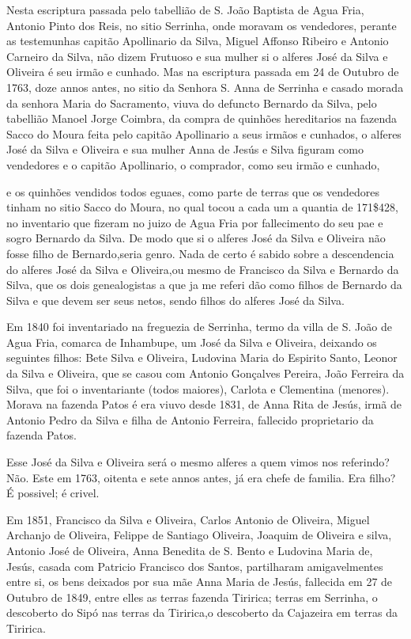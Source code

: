 Nesta escriptura passada pelo tabellião de S. João Baptista de Agua Fria, Antonio Pinto dos Reis, no sitio Serrinha, onde  moravam os vendedores, perante as testemunhas capitão
Apollinario da Silva, Miguel Affonso Ribeiro e Antonio Carneiro da Silva, não dizem Frutuoso e sua mulher si o alferes José da Silva e Oliveira é seu irmão e cunhado. Mas na escriptura passada em 24 de Outubro de 1763, doze annos antes, no sitio da Senhora S. Anna de Serrinha e casado morada da senhora Maria do Sacramento, viuva do defuncto Bernardo da Silva, pelo tabellião Manoel Jorge Coimbra, da compra de quinhões hereditarios na fazenda Sacco do Moura feita pelo capitão Apollinario a seus irmãos e cunhados, o alferes José da Silva e Oliveira e sua mulher Anna de Jesús e Silva figuram como vendedores e o capitão Apollinario, o comprador, como  seu irmão e cunhado,

e os quinhões vendidos todos eguaes, como parte de terras que os vendedores tinham no sitio Sacco do Moura, no qual tocou a cada um a quantia de 171\$428, no inventario que fizeram no juizo de Agua Fria por fallecimento do seu pae e sogro Bernardo da Silva. De modo que si o alferes José da Silva e Oliveira não fosse filho de Bernardo,seria genro. Nada de certo é sabido sobre a descendencia do alferes José da Silva e Oliveira,ou mesmo de Francisco da Silva e Bernardo da Silva, que os dois genealogistas a que ja me referi dão como filhos de Bernardo da Silva e  que devem ser seus netos, sendo filhos do alferes José da Silva.

Em 1840 foi inventariado na freguezia de Serrinha, termo da  villa de S. João de Agua Fria, comarca de Inhambupe, um José da Silva e Oliveira, deixando os seguintes filhos: Bete Silva e Oliveira, Ludovina Maria do Espirito Santo, Leonor da Silva e Oliveira, que se casou com Antonio Gonçalves Pereira, João Ferreira da Silva, que foi o inventariante (todos maiores), Carlota e Clementina (menores). Morava na fazenda Patos é era viuvo desde 1831, de Anna Rita de Jesús, irmã de Antonio Pedro da Silva e filha de Antonio Ferreira, fallecido proprietario da fazenda Patos.

Esse José da Silva e Oliveira será o mesmo alferes a quem vimos nos referindo? Não. Este em 1763, oitenta e sete annos antes, já era chefe de familia. Era filho? É possivel; é crivel.

Em 1851, Francisco da Silva e Oliveira, Carlos Antonio de Oliveira, Miguel Archanjo de Oliveira, Felippe de Santiago Oliveira, Joaquim de Oliveira e silva, Antonio José de Oliveira, Anna Benedita de S. Bento e Ludovina Maria de, Jesús, casada com Patricio Francisco dos Santos, partilharam amigavelmentes entre si, os bens deixados por sua mãe Anna Maria de Jesús, fallecida em 27 de Outubro de 1849, entre elles as terras fazenda Tiririca; terras em Serrinha, o descoberto do Sipó nas terras da Tiririca,o descoberto da Cajazeira em terras da Tiririca.

